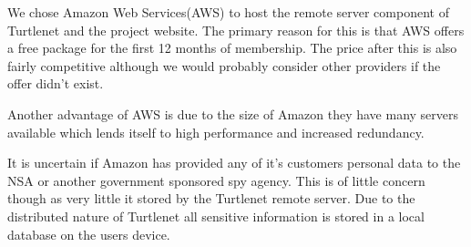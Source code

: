 We chose Amazon Web Services(AWS) to host the remote server component of Turtlenet and the project website.
The primary reason for this is that AWS offers a free package for the first 12 months of membership. The price after
this is also fairly competitive although we would probably consider other providers if the offer didn't exist.

Another advantage of AWS is due to the size of Amazon they have many servers available which lends itself to high 
performance and increased redundancy.

It is uncertain if Amazon has provided any of it's customers personal data to the NSA or another government sponsored 
spy agency. This is of little concern though as very little it stored by the Turtlenet remote server. Due to the 
distributed nature of Turtlenet all sensitive information is stored in a local database on the users device.
